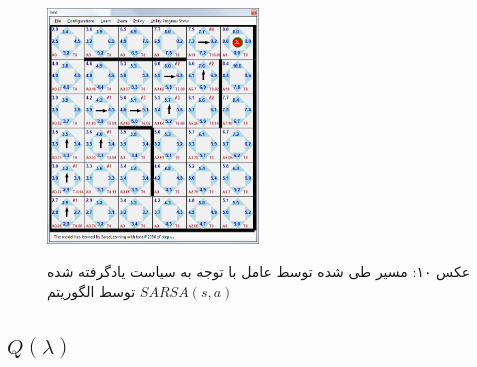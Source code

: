 \documentclass[10pt,a4paper]{article}
\begin{document}
\begin{figure}[H]
    \centering
    \includegraphics[width=0.5\textwidth]{r-exec}
    \begin{center}
    \textarabic{عکس ۱۰: مسیر طی شده توسط عامل با توجه به سیاست یادگرفته شده توسط الگوریتم $SARSA(s, a)$ }
    \end{center}
\end{figure}


\subsection{$Q(\lambda)$}
\end{document}

